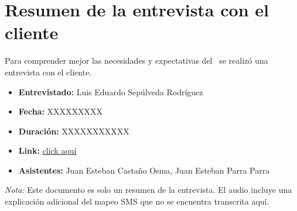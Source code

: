 \section{Resumen de la entrevista con el cliente}

Para comprender mejor las necesidades y expectativas del \GRID\, se realizó una entrevista con el cliente.

\begin{itemize}
	\item \textbf{Entrevistado:} Luis Eduardo Sepúlveda Rodríguez
	\item \textbf{Fecha:} XXXXXXXXX
	\item \textbf{Duración:} XXXXXXXXXXX
	\item \textbf{Link:} \href{https://drive.google.com}{click aquí}
	\item \textbf{Asistentes:} Juan Esteban Castaño Osma, Juan Esteban Parra Parra
\end{itemize}


\bigskip\noindent \textit{Nota:} Este documento es solo un resumen de la entrevista. El audio incluye una explicación adicional del mapeo SMS que no se encuentra transcrita aquí.
